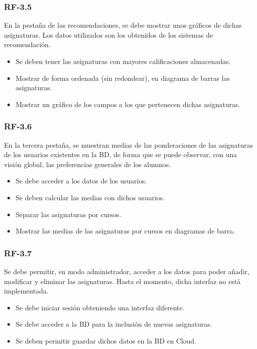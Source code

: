 \subsubsection{RF-3.5}
En la pestaña de las recomendaciones, se debe mostrar unos gráficos de dichas asignaturas. Los datos utilizados son los obtenidos de los sistemas de recomendación. 
\begin{itemize}
\item Se deben tener las asignaturas con mayores calificaciones almacenadas. 
\item Mostrar de forma ordenada (sin redondear), en diagrama de barras las asignaturas. 
\item Mostrar un gráfico de los campos a los que pertenecen dichas asignaturas. 
\end{itemize} 

\subsubsection{RF-3.6}
En la tercera pestaña, se muestran medias de las ponderaciones de las asignaturas de los usuarios existentes en la BD, de forma que se puede observar, con una visión global, las preferencias generales de los alumnos. 
\begin{itemize}
\item Se debe acceder a los datos de los usuarios. 
\item Se deben calcular las medias con dichos usuarios. 
\item Separar las asignaturas por cursos. 
\item Mostrar las medias de las asignaturas por cursos en diagramas de barra. 
\end{itemize} 

\subsubsection{RF-3.7}
Se debe permitir, en modo administrador, acceder a los datos para poder añadir, modificar y eliminar las asignaturas. Hasta el momento, dicha interfaz no está implementada. 
\begin{itemize}
\item Se debe iniciar sesión obteniendo una interfaz diferente. 
\item Se debe acceder a la BD para la inclusión de nuevas asignaturas. 
\item Se deben permitir guardar dichos datos en la BD en Cloud. 

\end{itemize} 
